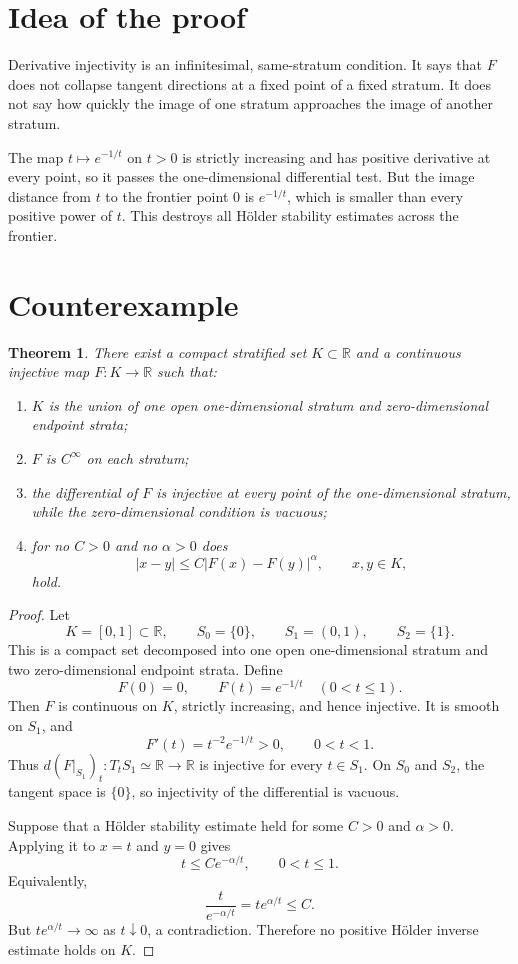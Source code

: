\documentclass[11pt]{article}
\newtheorem{theorem}{Theorem}
\newcommand{\R}{\mathbb R}
\begin{document}
\section{Idea of the proof}

Derivative injectivity is an infinitesimal, same-stratum condition.  It says
that \(F\) does not collapse tangent directions at a fixed point of a fixed
stratum.  It does not say how quickly the image of one stratum approaches the
image of another stratum.

The map \(t\mapsto e^{-1/t}\) on \(t>0\) is strictly increasing and has
positive derivative at every point, so it passes the one-dimensional
differential test.  But the image distance from \(t\) to the frontier point
\(0\) is \(e^{-1/t}\), which is smaller than every positive power of \(t\).
This destroys all H\"older stability estimates across the frontier.

\section{Counterexample}

\begin{theorem}\label{thm:frontier-obstruction}
There exist a compact stratified set \(K\subset\R\) and a continuous injective
map \(F:K\to\R\) such that:
\begin{enumerate}
\item \(K\) is the union of one open one-dimensional stratum and
  zero-dimensional endpoint strata;
\item \(F\) is \(C^\infty\) on each stratum;
\item the differential of \(F\) is injective at every point of the
  one-dimensional stratum, while the zero-dimensional condition is vacuous;
\item for no \(C>0\) and no \(\alpha>0\) does
  \[
    |x-y|\le C|F(x)-F(y)|^\alpha,\qquad x,y\in K,
  \]
  hold.
\end{enumerate}
\end{theorem}

\begin{proof}
Let
\[
  K=[0,1]\subset\R,\qquad S_0=\{0\},\qquad S_1=(0,1),\qquad S_2=\{1\}.
\]
This is a compact set decomposed into one open one-dimensional stratum and two
zero-dimensional endpoint strata.  Define
\[
  F(0)=0,\qquad F(t)=e^{-1/t}\quad(0<t\le 1).
\]
Then \(F\) is continuous on \(K\), strictly increasing, and hence injective.
It is smooth on \(S_1\), and
\[
  F'(t)=t^{-2}e^{-1/t}>0,\qquad 0<t<1.
\]
Thus \(d(F|_{S_1})_t:T_tS_1\simeq\R\to\R\) is injective for every \(t\in S_1\).
On \(S_0\) and \(S_2\), the tangent space is \(\{0\}\), so injectivity of the
differential is vacuous.

Suppose that a H\"older stability estimate held for some \(C>0\) and
\(\alpha>0\).  Applying it to \(x=t\) and \(y=0\) gives
\[
  t\le C e^{-\alpha/t},\qquad 0<t\le 1.
\]
Equivalently,
\[
  \frac{t}{e^{-\alpha/t}}=t e^{\alpha/t}\le C.
\]
But \(t e^{\alpha/t}\to\infty\) as \(t\downarrow0\), a contradiction.  Therefore
no positive H\"older inverse estimate holds on \(K\).
\end{proof}
\end{document}
